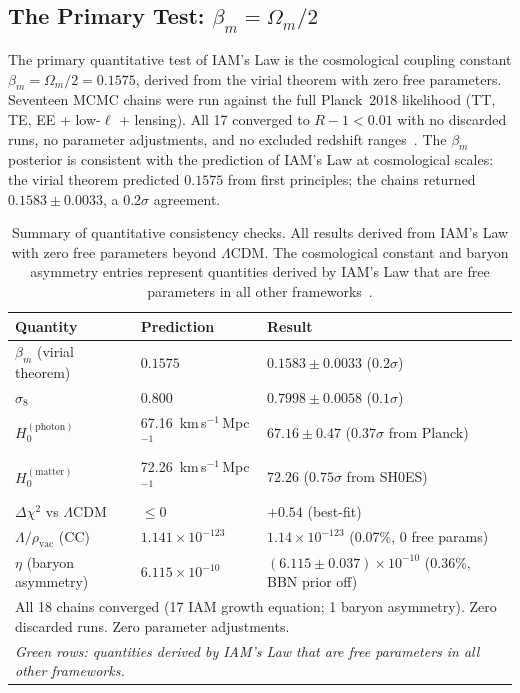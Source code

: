 \documentclass[12pt,a4paper]{article}
\begin{document}
\subsection{The Primary Test: $\beta_m = \Omega_m/2$}

The primary quantitative test of IAM's Law is the cosmological
coupling constant $\beta_m = \Omega_m/2 = 0.1575$, derived from
the virial theorem with zero free parameters. Seventeen MCMC chains
were run against the full Planck~2018 likelihood (TT, TE, EE +
low-$\ell$ + lensing). All 17 converged to $R-1 < 0.01$ with no
discarded runs, no parameter adjustments, and no excluded redshift
ranges~\citep{IAM_archive}. The $\beta_m$ posterior is consistent
with the prediction of IAM's Law at cosmological scales: the virial
theorem predicted $0.1575$ from first principles; the chains returned
$0.1583 \pm 0.0033$, a $0.2\sigma$ agreement.

\begin{table}[h]
\centering
\small
\caption{Summary of quantitative consistency checks. All results derived
from IAM's Law with zero free parameters beyond
$\Lambda$CDM. The cosmological constant and baryon asymmetry entries
represent quantities derived by IAM's Law that are free parameters in
all other frameworks~\citep{IAM_archive}.}
\label{tab:chains}
\begin{tabular}{p{4.5cm}p{3.6cm}p{4.4cm}}
\toprule
\textbf{Quantity} & \textbf{Prediction} & \textbf{Result} \\
\midrule
$\beta_m$ (virial theorem) &
  $0.1575$ &
  $0.1583 \pm 0.0033$ ($0.2\sigma$) \\
$\sigma_8$ &
  $0.800$ &
  $0.7998 \pm 0.0058$ ($0.1\sigma$) \\
$H_0^\mathrm{(photon)}$ &
  67.16~km\,s$^{-1}$\,Mpc$^{-1}$ &
  $67.16 \pm 0.47$ ($0.37\sigma$ from Planck) \\
$H_0^\mathrm{(matter)}$ &
  72.26~km\,s$^{-1}$\,Mpc$^{-1}$ &
  $72.26$ ($0.75\sigma$ from SH0ES) \\
$\Delta\chi^2$ vs $\Lambda$CDM &
  $\leq 0$ &
  $+0.54$ (best-fit) \\
\rowcolor{newresult}
$\Lambda/\rho_\mathrm{vac}$ (CC) &
  $1.141\times10^{-123}$ &
  $1.14\times10^{-123}$ (0.07\%, 0 free params) \\
\rowcolor{newresult}
$\eta$ (baryon asymmetry) &
  $6.115\times10^{-10}$ &
  $(6.115\pm0.037)\times10^{-10}$ (0.36\%, BBN prior off) \\
\midrule
\multicolumn{3}{l}{All 18 chains converged (17 IAM growth equation;
  1 baryon asymmetry). Zero discarded runs. Zero parameter adjustments.} \\
\multicolumn{3}{l}{\textit{Green rows: quantities derived by IAM's Law
  that are free parameters in all other frameworks.}} \\
\bottomrule
\end{tabular}
\end{table}
\end{document}
